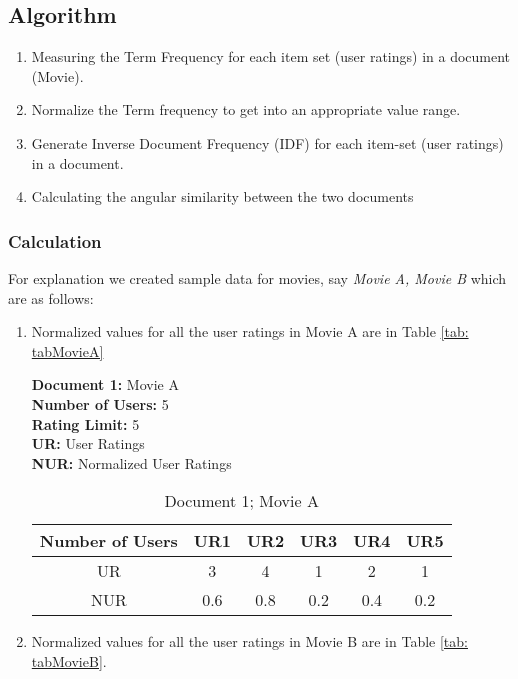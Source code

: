 \documentclass[12pt, titlepage, onecolumn]{article}
\begin{document}
{\subsection{Algorithm}
\begin{enumerate}[ {STEP }1{:}]
	\item Measuring the Term Frequency for each item set (user ratings) in a document (Movie). 
	\item Normalize the Term frequency to get into an appropriate value range.
	\item Generate Inverse Document Frequency (IDF) for each item-set (user ratings) in a document.
	\item Calculating the angular similarity between the two documents 
\end{enumerate}

\subsubsection{Calculation}
For explanation we created sample data for movies, say \emph{Movie A, Movie B} which are as follows:

\begin{enumerate}
	\item Normalized values for all the user ratings in Movie A are in Table \ref{tab: tabMovieA}
	
		{\bf Document 1: } Movie A\\
		{\bf Number of Users: }5\\
		{\bf Rating Limit: }5\\
		{\bf UR: }User Ratings\\
		{\bf NUR: }Normalized User Ratings		
		\begin{table}[ht]
		\label{tab: tabMovieA}
		
		\begin{center}
		\begin{tabular}{cccccc}
    		\hline
       			Number of Users	&	UR1	&	UR2	&	UR3	&	UR4	&	UR5\\
		\hline
    			UR				&	3	&	4	&	1	&	2	&	1\\
			NUR				&	0.6	&	0.8	&	0.2	&	0.4	&	0.2\\
    		\hline
		\end{tabular}
		\caption{Document 1; Movie A}
		\end{center}
		\label{tab:movieA}
		\end{table}
		
	\item Normalized values for all the user ratings in Movie B are in Table \ref{tab: tabMovieB}.
	

\end{enumerate}}
\end{document}
